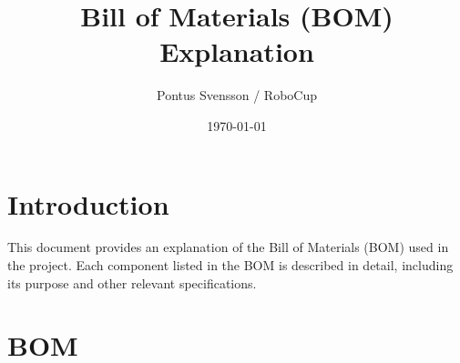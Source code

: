 \documentclass[a4paper,8pt]{article}
\title{Bill of Materials (BOM) Explanation}
\author{ Pontus Svensson / RoboCup }
\date{\today}
\begin{document}
\maketitle

\newpage
\tableofcontents

\newpage

\section{Introduction}

This document provides an explanation of the Bill of Materials (BOM)
used in the project. Each component listed in the BOM is
described in detail, including its purpose and other relevant
specifications.

\section{BOM}
\end{document}
